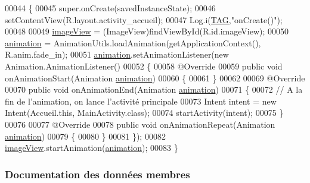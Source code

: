 \begin{DoxyCode}
00044     \{
00045         super.onCreate(savedInstanceState);
00046         setContentView(R.layout.activity\_accueil);
00047         Log.i(\hyperlink{classcom_1_1lasalle_1_1io__trucks_1_1_accueil_a1a3ee3728fab660903bb4399a2e49d49}{TAG},\textcolor{stringliteral}{"onCreate()"});
00048 
00049         \hyperlink{classcom_1_1lasalle_1_1io__trucks_1_1_accueil_a63484f52fc632e91aad7275ea7be0f7b}{imageView} = (ImageView)findViewById(R.id.imageView);
00050         \hyperlink{classcom_1_1lasalle_1_1io__trucks_1_1_accueil_a61fc1cafddccd078251374fa264adc4f}{animation} = AnimationUtils.loadAnimation(getApplicationContext(), R.anim.fade\_in);
00051         \hyperlink{classcom_1_1lasalle_1_1io__trucks_1_1_accueil_a61fc1cafddccd078251374fa264adc4f}{animation}.setAnimationListener(\textcolor{keyword}{new} Animation.AnimationListener()
00052         \{
00058             @Override
00059             \textcolor{keyword}{public} \textcolor{keywordtype}{void} onAnimationStart(Animation \hyperlink{classcom_1_1lasalle_1_1io__trucks_1_1_accueil_a61fc1cafddccd078251374fa264adc4f}{animation})
00060             \{
00061             \}
00062 
00069             @Override
00070             \textcolor{keyword}{public} \textcolor{keywordtype}{void} onAnimationEnd(Animation \hyperlink{classcom_1_1lasalle_1_1io__trucks_1_1_accueil_a61fc1cafddccd078251374fa264adc4f}{animation})
00071             \{
00072                 \textcolor{comment}{// A la fin de l'animation, on lance l'activité principale}
00073                 Intent intent = \textcolor{keyword}{new} Intent(Accueil.this, MainActivity.class);
00074                 startActivity(intent);
00075             \}
00076 
00077             @Override
00078             \textcolor{keyword}{public} \textcolor{keywordtype}{void} onAnimationRepeat(Animation \hyperlink{classcom_1_1lasalle_1_1io__trucks_1_1_accueil_a61fc1cafddccd078251374fa264adc4f}{animation})
00079             \{
00080             \}
00081         \});
00082         \hyperlink{classcom_1_1lasalle_1_1io__trucks_1_1_accueil_a63484f52fc632e91aad7275ea7be0f7b}{imageView}.startAnimation(\hyperlink{classcom_1_1lasalle_1_1io__trucks_1_1_accueil_a61fc1cafddccd078251374fa264adc4f}{animation});
00083     \}
\end{DoxyCode}


\subsubsection{Documentation des données membres}
\mbox{\label{classcom_1_1lasalle_1_1io__trucks_1_1_accueil_a61fc1cafddccd078251374fa264adc4f}} 
